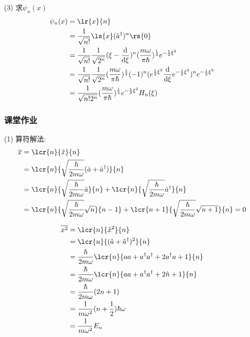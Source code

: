 \begin{frame}
    \frametitle{}
    (3) 求$\psi_n (x)$
    \[ 
      \begin{aligned}
        \psi_n (x) &= \lr{x}{n}  \\ 
        &=  \frac{1}{\sqrt{n!}}\ls{x} (\hat{a}^\dagger)^n \rs{0}   \\ 
        &=  \frac{1}{\sqrt{n!}}  \frac{1}{\sqrt{2^n}} (\xi - \frac{\mathrm{d} }{\mathrm{d}\xi} )^n (\frac{m \omega }{\pi  \hbar})^{\frac{1}{4}}  e^{- \frac{1 }{2 } \xi^2}    \\ 
        &=  \frac{1}{\sqrt{n!}}  \frac{1}{\sqrt{2^n}} (\frac{m \omega }{\pi  \hbar})^{\frac{1}{4}} (-1)^n (  e ^{\frac{1}{2}\xi^2} \frac{\mathrm{d} }{\mathrm{d}\xi} e ^{-\frac{1}{2}\xi^2})^n  e^{- \frac{1 }{2 } \xi^2}  \\  
        &= \frac{1}{\sqrt{n!2^n}} (\frac{m \omega }{\pi  \hbar})^{\frac{1}{4}} e^{- \frac{1 }{2 } \xi^2} H_n(\xi)  
      \end{aligned} \] 
\end{frame}

\begin{frame}
    \frametitle{课堂作业}
    \例 [13. 求量子谐振子在真空态下的位置和动量的量子涨落]{\[ \Delta x \Delta p_x =\frac{\hbar}{2} \]}
    \解 (1) 算符解法: 
    \[\begin{aligned}
       \overline{x} & = \lcr{n}{\hat{x}}{n} \\ 
       &=  \lcr{n}{ \sqrt{\frac{\hbar}{2m\omega}} (\hat{a}+ \hat{a}^\dagger)}{n} \\ 
       &=  \lcr{n}{ \sqrt{\frac{\hbar}{2m\omega}} \hat{a}}{n} + \lcr{n}{ \sqrt{\frac{\hbar}{2m\omega}} \hat{a}^\dagger}{n}  \\ 
       &=  \lcr{n}{ \sqrt{\frac{\hbar}{2m\omega}} \sqrt{n}}{n-1} + \lcr{n+1}{ \sqrt{\frac{\hbar}{2m\omega}} \sqrt{n+1} }{n} =0  \\
   \end{aligned} \]     
   \end{frame}
   
   \begin{frame}
   \[\begin{aligned}
       \overline{x^2} & = \lcr{n}{\hat{x}^2}{n} \\ 
       &=  \lcr{n}{ (\hat{a}+ \hat{a}^\dagger)^2}{n} \\ 
       &= \frac{\hbar}{2m\omega} \lcr{n}{ aa + {a}^\dagger {a}^\dagger + 2{a}^\dagger a + 1}{n} \\ 
       &= \frac{\hbar}{2m\omega} \lcr{n}{ aa + {a}^\dagger {a}^\dagger + 2 \hat{n} + 1}{n} \\ 
       &= \frac{\hbar}{2m\omega} (2n+1)  \\ 
       &= \frac{1}{m\omega^2}  (n+\frac{1}{2})\hbar\omega \\ 
       &= \frac{1}{m\omega^2} E_n
   \end{aligned} \]     
   \end{frame}
   
